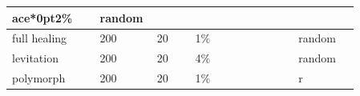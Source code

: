 \begin{longtable}{|>{\RaggedRight}p{0.23462\linewidth}|>{\RaggedRight}p{0.08075\linewidth}|>{\RaggedRight}p{0.10890\linewidth}|>{\RaggedRight}p{0.27027\linewidth}|>{\RaggedRight}p{0.16262\linewidth}|}
ace*{0pt}\ignorespaces{}\hspace*{0pt}2\%&\hspace*{0pt}\ignorespaces{}\hspace*{0pt}random\footnotemark[58]\\ \hline \hspace*{0pt}\ignorespaces{}\hspace*{0pt}full healing\footnotemark[59]&\hspace*{0pt}\ignorespaces{}\hspace*{0pt}200&\hspace*{0pt}\ignorespaces{}\hspace*{0pt}20&\hspace*{0pt}\ignorespaces{}\hspace*{0pt}1\%&\hspace*{0pt}\ignorespaces{}\hspace*{0pt}random\footnotemark[60]\\ \hline \hspace*{0pt}\ignorespaces{}\hspace*{0pt}levitation\footnotemark[61]&\hspace*{0pt}\ignorespaces{}\hspace*{0pt}200&\hspace*{0pt}\ignorespaces{}\hspace*{0pt}20&\hspace*{0pt}\ignorespaces{}\hspace*{0pt}4\%&\hspace*{0pt}\ignorespaces{}\hspace*{0pt}random\footnotemark[62]\\ \hline \hspace*{0pt}\ignorespaces{}\hspace*{0pt}polymorph\footnotemark[63]&\hspace*{0pt}\ignorespaces{}\hspace*{0pt}200&\hspace*{0pt}\ignorespaces{}\hspace*{0pt}20&\hspace*{0pt}\ignorespaces{}\hspace*{0pt}1\%&\hspace*{0pt}\ignorespaces{}\hspace*{0pt}r
\end{longtable}
